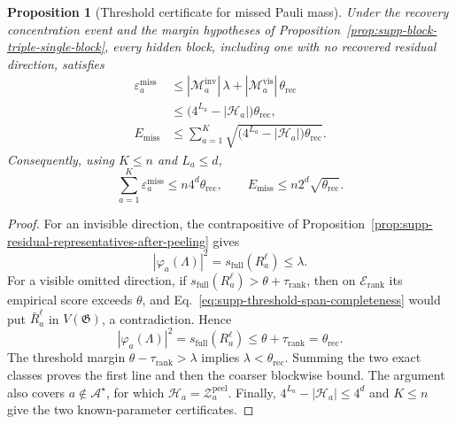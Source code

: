 \documentclass[
  aps,
  prx,
  reprint,
  superscriptaddress,
  amsmath,
  amssymb,
  nofootinbib,
  longbibliography
]{revtex4-2}
\newtheorem{proposition}[theorem]{Proposition}
\begin{document}
\begin{proposition}[Threshold certificate for missed Pauli mass]
\label{prop:supp-missed-pauli-threshold-certificate}
Under the recovery concentration event and the margin hypotheses of
Proposition~\ref{prop:supp-block-triple-single-block}, every hidden block,
including one with no recovered residual direction, satisfies
\begin{align}
\varepsilon_a^{\mathrm{miss}}
&\le
|\mathcal M_a^{\mathrm{inv}}|\,\lambda
+
|\mathcal M_a^{\mathrm{vis}}|\,\theta_{\mathrm{rec}}
\nonumber\\
&\le
\bigl(4^{L_a}-|\mathcal H_a|\bigr)\theta_{\mathrm{rec}},
\label{eq:supp-block-threshold-missing-bound}\\
E_{\mathrm{miss}}
&\le
\sum_{a=1}^K
\sqrt{
\bigl(4^{L_a}-|\mathcal H_a|\bigr)\theta_{\mathrm{rec}}
}.
\label{eq:supp-global-missed-mass-sharp-certificate}
\end{align}
Consequently, using $K\le n$ and $L_a\le d$,
\begin{equation}
\sum_{a=1}^K\varepsilon_a^{\mathrm{miss}}
\le n4^d\theta_{\mathrm{rec}},
\qquad
E_{\mathrm{miss}}
\le n2^d\sqrt{\theta_{\mathrm{rec}}}.
\label{eq:supp-global-missed-mass-computable-certificate}
\end{equation}
\end{proposition}

\begin{proof}
For an invisible direction, the contrapositive of
Proposition~\ref{prop:supp-residual-representatives-after-peeling} gives
\begin{equation}
|\varphi_a(\Lambda)|^2
=
s_{\mathrm{full}}(R_a^\ell)
\le\lambda.
\end{equation}
For a visible omitted direction, if
$s_{\mathrm{full}}(R_a^\ell)>\theta+\tau_{\mathrm{rank}}$, then on
$\mathcal E_{\mathrm{rank}}$ its empirical score exceeds $\theta$, and
Eq.~\eqref{eq:supp-threshold-span-completeness} would put
$\bar R_a^\ell$ in $V(\mathfrak G)$, a contradiction.  Hence
\begin{equation}
|\varphi_a(\Lambda)|^2
=
s_{\mathrm{full}}(R_a^\ell)
\le\theta+\tau_{\mathrm{rank}}
=\theta_{\mathrm{rec}}.
\end{equation}
The threshold margin
$\theta-\tau_{\mathrm{rank}}>\lambda$ implies
$\lambda<\theta_{\mathrm{rec}}$.  Summing the two exact classes proves the
first line and then the coarser blockwise bound.  The argument also covers
$a\notin\mathcal A^\star$, for which
$\mathcal H_a=\mathcal Z_a^{\mathrm{peel}}$.  Finally,
$4^{L_a}-|\mathcal H_a|\le4^d$ and $K\le n$ give the two known-parameter
certificates.
\end{proof}
\end{document}
